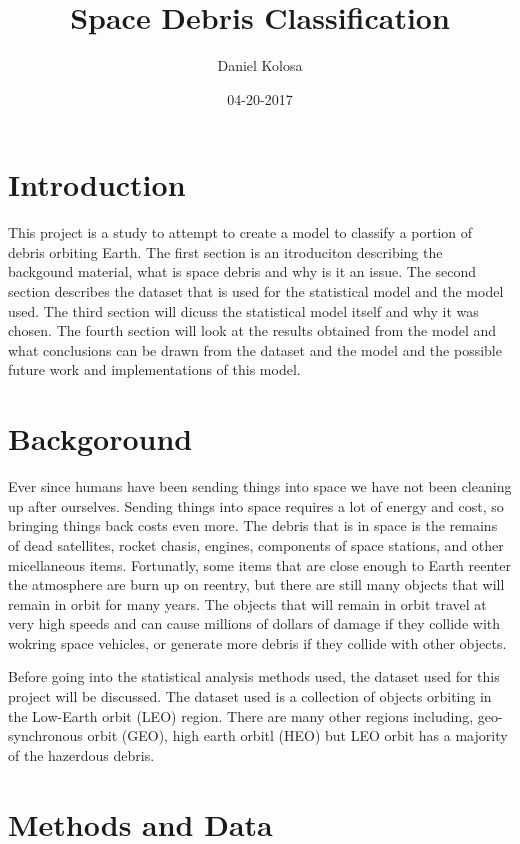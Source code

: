 \documentclass[12pt,a4paper]{article}
\title{Space Debris Classification}
\author{Daniel Kolosa}
\date{04-20-2017}
\begin{document}
\maketitle

\section{Introduction}
This project is a study to attempt to create a model to classify a portion of debris orbiting Earth. The first section is an itroduciton describing the backgound material, what is space debris and why is it an issue. The second section describes the dataset that is used for the statistical model and the model used. The third section will dicuss the statistical model itself and why it was chosen. The fourth section will look at the results obtained from the model and what conclusions can be drawn from the dataset and the model and the possible future work and implementations of this model.   

\section{Backgoround}
Ever since humans have been sending things into space we have not been cleaning up after ourselves. Sending things into space requires a lot of energy and cost, so bringing things back costs even more. The debris that is in space is the remains of dead satellites, rocket chasis, engines, components of space stations, and other micellaneous items. Fortunatly, some items that are close enough to Earth reenter the atmosphere are burn up on reentry, but there are still many objects that will remain in orbit for many years. The objects that will remain in orbit travel at very high speeds and can cause millions of dollars of damage if they collide with wokring space vehicles, or generate more debris if they collide with other objects.  

Before going into the statistical analysis methods used, the dataset used for this project will be discussed.
The dataset used is a collection of objects orbiting in the Low-Earth orbit (LEO) region. There are many other regions including, geo-synchronous orbit (GEO), high earth orbitl (HEO) but LEO orbit has a majority of the hazerdous debris. 

\section{Methods and Data}
\end{document}
